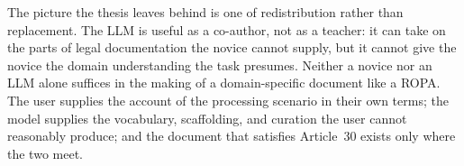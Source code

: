 The picture the thesis leaves behind is one of redistribution
rather than replacement. The LLM is useful as a co-author,
not as a teacher: it can take on the parts of legal
documentation the novice cannot supply, but it cannot give
the novice the domain understanding the task presumes.
Neither a novice nor an LLM alone suffices in the making of a
domain-specific document like a ROPA. The user supplies the
account of the processing scenario in their own terms; the
model supplies the vocabulary, scaffolding, and curation the
user cannot reasonably produce; and the document that
satisfies Article~30 exists only where the two meet.
